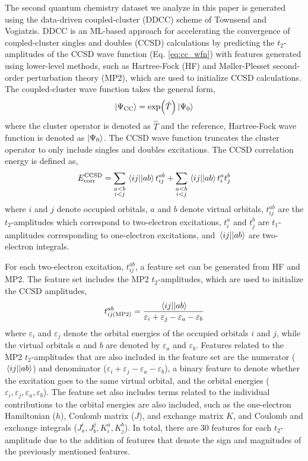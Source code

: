 \documentclass[journal=jacsat,manuscript=article]{achemso}
\begin{document}
The second quantum chemistry dataset we analyze in this paper is generated using the data-driven coupled-cluster (DDCC) scheme of Townsend and Vogiatzis.\cite{townsend_data-driven_2019}
DDCC is an ML-based approach for accelerating the convergence of coupled-cluster singles and doubles (CCSD) calculations by predicting the $t_{2}$-amplitudes of the CCSD wave function (Eq. \ref{eq:cc_wfn}) with features generated using lower-level methods, such as Hartree-Fock (HF) and M{\o}ller-Plesset second-order perturbation theory (MP2), which are used to initialize CCSD calculations.
The coupled-cluster wave function takes the general form,
\begin{equation}
	\ket{\Psi_{\text{CC}}} = \exp(\hat{T}) \ket{\Psi_{0}}
	\label{eq:cc_wfn}
\end{equation}
where the cluster operator is denoted as $\hat{T}$ and the reference, Hartree-Fock wave function is denoted as $\ket{\Psi_{0}}$.
The CCSD wave function truncates the cluster operator to only include singles and doubles excitations.
The CCSD correlation energy is defined as,
\begin{equation}
	E^{\text{CCSD}}_{\text{corr}} = \sum_{\substack{a<b \\ i<j}} \mel{ij}{}{ab} t^{ab}_{ij} + \sum_{\substack{a<b \\ i<j}} \mel{ij}{}{ab} t^{a}_{i} t^{b}_{j}
	\label{eq:cc_corr}
\end{equation}
where $i$ and $j$ denote occupied orbitals, $a$ and $b$ denote virtual orbitals, $t^{ab}_{ij}$ are the $t_{2}$-amplitudes which correspond to two-electron excitations, 
$t^{a}_{i}$ and $t^{b}_{j}$ are $t_{1}$-amplitudes corresponding to one-electron excitations, and $\mel{ij}{}{ab}$ are two-electron integrals.

For each two-electron excitation, $t^{ab}_{ij}$, a feature set can be generated from HF and MP2.
The feature set includes the MP2 $t_{2}$-amplitudes, which are used to initialize the CCSD amplitudes,
\begin{equation}
	t^{ab}_{ij(\text{MP2})} = \frac{\mel{ij}{}{ab}}{\varepsilon_{i}+\varepsilon_{j}-\varepsilon_{a}-\varepsilon_{b}}
	\label{eq:MP2_t2}
\end{equation}
where $\varepsilon_{i}$ and $\varepsilon_{j}$ denote the orbital energies of the occupied orbitals $i$ and $j$, while the virtual orbitals $a$ and $b$ are denoted by $\varepsilon_{a}$ and $\varepsilon_{b}$.
Features related to the MP2 $t_{2}$-amplitudes that are also included in the feature set are the numerator ($\mel{ij}{}{ab}$) and denominator ($\varepsilon_{i}+\varepsilon_{j}-\varepsilon_{a}-\varepsilon_{b}$), a binary feature to denote whether the excitation goes to the same virtual orbital, and the orbital energies ($\varepsilon_{i},\varepsilon_{j},\varepsilon_{a},\varepsilon_{b}$).
The feature set also includes terms related to the individual contributions to the orbital energies are also included, such as the one-electron Hamiltonian ($h$), Coulomb matrix ($J$), and exchange matrix $K$, and Coulomb and exchange integrals ($J^{i}_{a},J^{j}_{b},K^{a}_{i},K^{b}_{j}$).
In total, there are 30 features for each $t_{2}$-amplitude due to the addition of features that denote the sign and magnitudes of the previously mentioned features.
\end{document}
